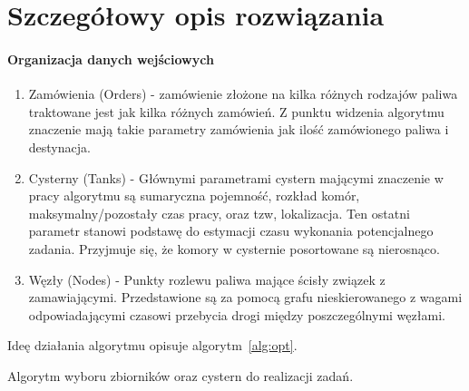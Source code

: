 \documentclass[11pt,a4paper,oneside]{mwart}
\begin{document}
\section{Szczegółowy opis rozwiązania}
 
\paragraph{Organizacja danych wejściowych}
\begin{enumerate}
  \item Zamówienia (Orders) - zamówienie złożone na kilka różnych rodzajów paliwa traktowane jest jak kilka różnych zamówień. Z punktu widzenia algorytmu znaczenie mają takie parametry zamówienia jak ilość zamówionego paliwa i destynacja.

  \item Cysterny (Tanks) - Głównymi parametrami cystern mającymi znaczenie w pracy algorytmu są sumaryczna pojemność, rozkład komór, maksymalny/pozostały czas pracy, oraz tzw, lokalizacja. Ten ostatni parametr stanowi podstawę do estymacji czasu wykonania potencjalnego zadania. Przyjmuje się, że komory  w cysternie posortowane są nierosnąco.


  \item Węzły (Nodes) - Punkty rozlewu paliwa mające ścisły związek z zamawiającymi. Przedstawione są za pomocą grafu nieskierowanego z wagami odpowiadającymi czasowi przebycia drogi między poszczególnymi węzłami.

\end{enumerate}

Ideę działania algorytmu opisuje algorytm~\ref{alg:opt}.

\begin{algorithm}[htbp]
  \caption{Algorytm wyboru zbiorników oraz cystern do realizacji zadań.}
  \label{alg:opt}
  \begin{algorithmic}
        \ENDIF
          \ELSE 
        \ENDIF
       \ELSE
      \ENDIF
     \ELSE
    \ENDIF

    \ENDWHILE
  \end{algorithmic}
\end{algorithm}
\end{document}
